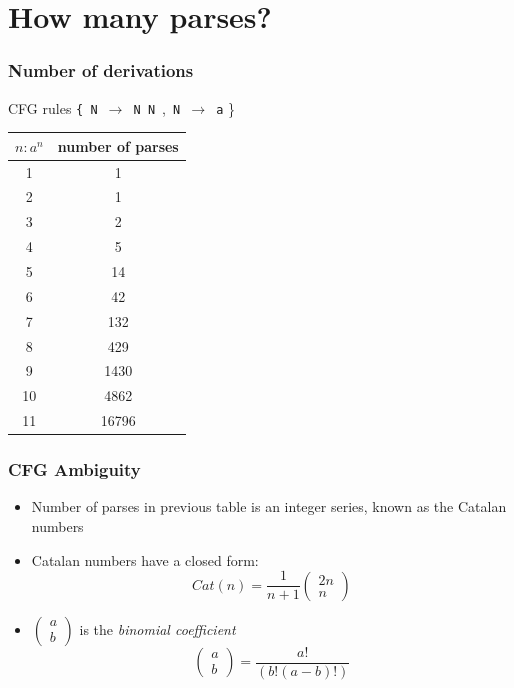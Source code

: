 \section{How many parses?}

\begin{frame}
\frametitle{Number of derivations}
CFG rules {\tt \{ N $\rightarrow$ N N}\ ,\  {\tt N $\rightarrow$ a} \} \\
\begin{tabular}{|c|c|}
\hline 
$n : a^n$ & number of parses \\
\hline 
1 & 1 \\
2 & 1 \\
3 & 2 \\
4 & 5 \\
5 & 14 \\
6 & 42 \\
7 & 132 \\
8 & 429 \\
9 & 1430 \\
10 & 4862 \\
11 & 16796 \\
\hline
\end{tabular}

\end{frame}

\begin{frame}
\frametitle{CFG Ambiguity}
  \begin{itemize}
  \item Number of parses in previous table is an integer series, known as the Catalan numbers
  \item Catalan numbers have a closed form:
\[ Cat(n) = \frac{1}{n+1} \left( \begin{array}{c}2n\\n\end{array} \right) \]
  \item $\left( \begin{array}{c}a\\b\end{array} \right)$ is the {\em binomial coefficient}
\[ \left( \begin{array}{c}a\\b\end{array} \right) = \frac{a!}{(b!(a-b)!)} \] 
  \end{itemize}

\end{frame}

